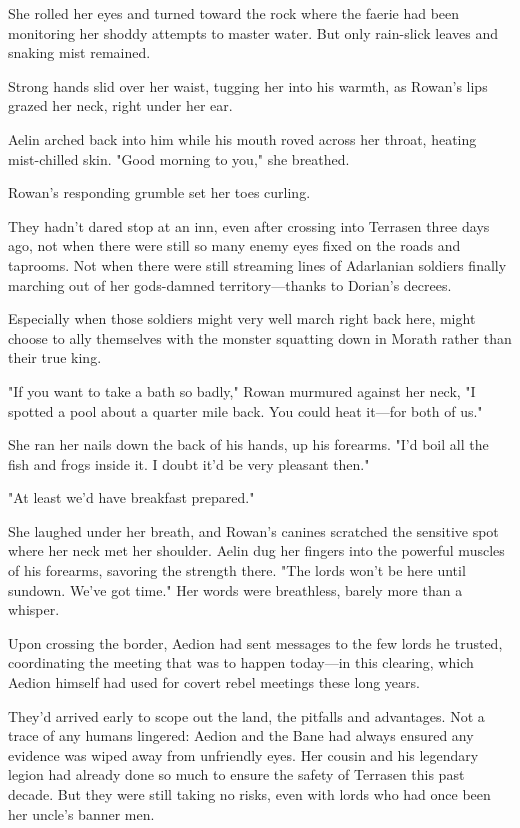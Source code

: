 She rolled her eyes and turned toward the rock where the faerie had been monitoring her shoddy attempts to master water.
But only rain-slick leaves and snaking mist remained.

Strong hands slid over her waist, tugging her into his warmth, as Rowan's lips grazed her neck, right under her ear.

Aelin arched back into him while his mouth roved across her throat, heating mist-chilled skin.
"Good morning to you," she breathed.

Rowan's responding grumble set her toes curling.

They hadn't dared stop at an inn, even after crossing into Terrasen three days ago, not when there were still so many enemy eyes fixed on the roads and taprooms.
Not when there were still streaming lines of Adarlanian soldiers finally marching out of her gods-damned territory---thanks to Dorian's decrees.

Especially when those soldiers might very well march right back here, might choose to ally themselves with the monster squatting down in Morath rather than their true king.

"If you want to take a bath so badly," Rowan murmured against her neck, "I spotted a pool about a quarter mile back.
You could heat it---for both of us."

She ran her nails down the back of his hands, up his forearms.
"I'd boil all the fish and frogs inside it.
I doubt it'd be very pleasant then."

"At least we'd have breakfast prepared."

She laughed under her breath, and Rowan's canines scratched the sensitive spot where her neck met her shoulder.
Aelin dug her fingers into the powerful muscles of his forearms, savoring the strength there.
"The lords won't be here until sundown.
We've got time."
Her words were breathless, barely more than a whisper.

Upon crossing the border, Aedion had sent messages to the few lords he trusted, coordinating the meeting that was to happen today---in this clearing, which Aedion himself had used for covert rebel meetings these long years.

They'd arrived early to scope out the land, the pitfalls and advantages.
Not a trace of any humans lingered: Aedion and the Bane had always ensured any evidence was wiped away from unfriendly eyes.
Her cousin and his legendary legion had already done so much to ensure the safety of Terrasen this past decade.
But they were still taking no risks, even with lords who had once been her uncle's banner men.

